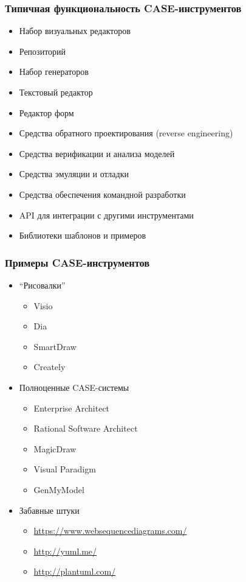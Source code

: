 \documentclass[xetex,mathserif,serif]{beamer}
\begin{document}
	\begin{frame}
		\frametitle{Типичная функциональность CASE-инструментов}
		\begin{itemize}
			\item Набор визуальных редакторов
			\item Репозиторий
			\item Набор генераторов
			\item Текстовый редактор
			\item Редактор форм
			\item Средства обратного проектирования (reverse engineering)
			\item Средства верификации и анализа моделей
			\item Средства эмуляции и отладки
			\item Средства обеспечения командной разработки
			\item API для интеграции с другими инструментами
			\item Библиотеки шаблонов и примеров
		\end{itemize}
	\end{frame}

	\begin{frame}
		\frametitle{Примеры CASE-инструментов}
		\begin{itemize}
			\item ``Рисовалки''
			\begin{itemize}
				\item Visio
				\item Dia
				\item SmartDraw
				\item Creately
			\end{itemize}
			\item Полноценные CASE-системы
			\begin{itemize}
				\item Enterprise Architect
				\item Rational Software Architect
				\item MagicDraw
				\item Visual Paradigm
				\item GenMyModel
			\end{itemize}
			\item Забавные штуки
			\begin{itemize}
				\item \url{https://www.websequencediagrams.com/}
				\item \url{http://yuml.me/}
				\item \url{http://plantuml.com/}
			\end{itemize}
		\end{itemize}
	\end{frame}
\end{document}
